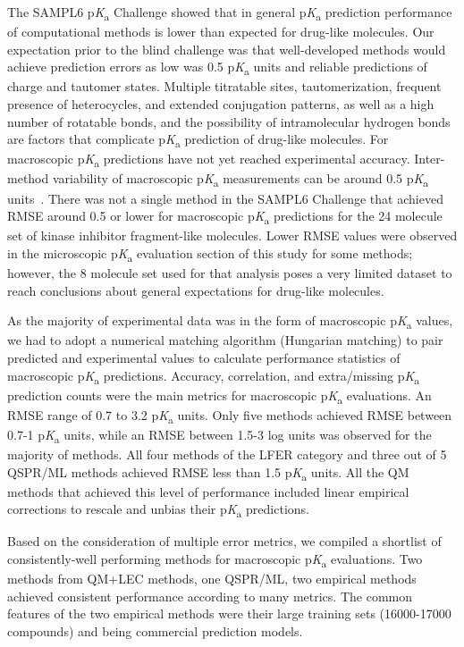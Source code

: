 \documentclass[9pt,lineno,final]{elife}
\newcommand{\pKa}{p\textit{K}\textsubscript{a}}
\begin{document}
The SAMPL6 \pKa{} Challenge showed that in general \pKa{} prediction performance of computational methods is lower than expected for drug-like molecules. 
Our expectation prior to the blind challenge was that well-developed methods would achieve prediction errors as low was 0.5 \pKa{} units and reliable predictions of charge and tautomer states. 
Multiple titratable sites, tautomerization, frequent presence of heterocycles, and extended conjugation patterns, as well as a high number of rotatable bonds, and the possibility of intramolecular hydrogen bonds are factors that complicate \pKa{} prediction of drug-like molecules.
For macroscopic \pKa{} predictions have not yet reached experimental accuracy. 
Inter-method variability of macroscopic \pKa{} measurements can be around 0.5 \pKa{} units~\citep{Fraczkiewicz:2013:ReferenceModuleinChemistryMolecularSciencesandChemicalEngineering}. 
There was not a single method in the SAMPL6 Challenge that achieved RMSE around 0.5 or lower for macroscopic \pKa{} predictions for the 24 molecule set of kinase inhibitor fragment-like molecules.
Lower RMSE values were observed in the microscopic \pKa{} evaluation section of this study for some methods; however, the 8 molecule set used for that analysis poses a very limited dataset to reach conclusions about general expectations for drug-like molecules.

As the majority of experimental data was in the form of macroscopic \pKa{} values, we had to adopt a numerical matching algorithm (Hungarian matching) to pair predicted and experimental values to calculate performance statistics of macroscopic \pKa{} predictions. Accuracy, correlation, and extra/missing \pKa{} prediction counts were the main metrics for macroscopic \pKa{} evaluations. An RMSE range of 0.7 to 3.2 \pKa{} units.
Only five methods achieved RMSE between 0.7-1 \pKa{} units, while an RMSE between 1.5-3 log units was observed for the majority of methods. All four methods of the LFER category and three out of 5 QSPR/ML methods achieved RMSE less than 1.5 \pKa{} units. All the QM methods that achieved this level of performance included linear empirical corrections to rescale and unbias their \pKa{} predictions. 

Based on the consideration of multiple error metrics, we compiled a shortlist of consistently-well performing methods for macroscopic \pKa{} evaluations. Two methods from QM+LEC methods, one QSPR/ML, two empirical methods achieved consistent performance according to many metrics. The common features of the two empirical methods were their large training sets (16000-17000 compounds) and being commercial prediction models.
\end{document}
